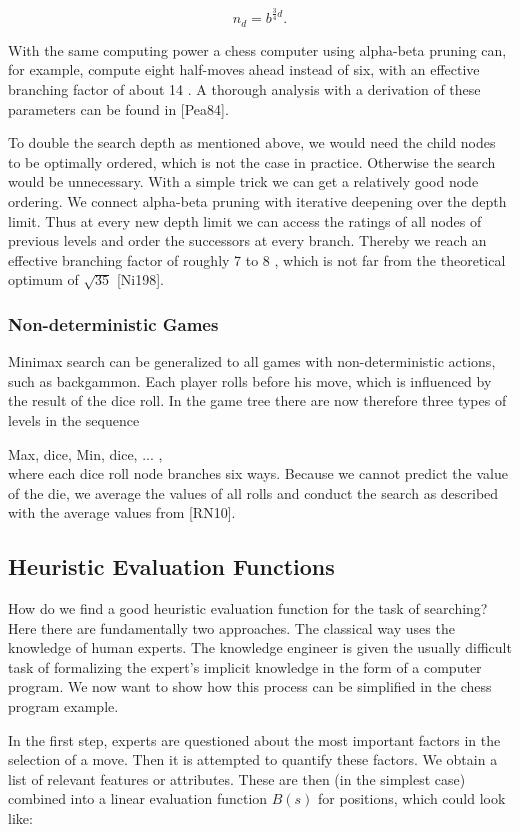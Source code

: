 \documentclass[10pt]{article}
\begin{document}
$$
n_{d}=b^{\frac{3}{4} d} .
$$

With the same computing power a chess computer using alpha-beta pruning can, for example, compute eight half-moves ahead instead of six, with an effective branching factor of about 14 . A thorough analysis with a derivation of these parameters can be found in [Pea84].

To double the search depth as mentioned above, we would need the child nodes to be optimally ordered, which is not the case in practice. Otherwise the search would be unnecessary. With a simple trick we can get a relatively good node ordering. We connect alpha-beta pruning with iterative deepening over the depth limit. Thus at every new depth limit we can access the ratings of all nodes of previous levels and order the successors at every branch. Thereby we reach an effective branching factor of roughly 7 to 8 , which is not far from the theoretical optimum of $\sqrt{35}$ [Ni198].

\subsubsection*{Non-deterministic Games}
Minimax search can be generalized to all games with non-deterministic actions, such as backgammon. Each player rolls before his move, which is influenced by the result of the dice roll. In the game tree there are now therefore three types of levels in the sequence

Max, dice, Min, dice, ... ,\\[0pt]
where each dice roll node branches six ways. Because we cannot predict the value of the die, we average the values of all rolls and conduct the search as described with the average values from [RN10].

\subsection*{Heuristic Evaluation Functions}
How do we find a good heuristic evaluation function for the task of searching? Here there are fundamentally two approaches. The classical way uses the knowledge of human experts. The knowledge engineer is given the usually difficult task of formalizing the expert's implicit knowledge in the form of a computer program. We now want to show how this process can be simplified in the chess program example.

In the first step, experts are questioned about the most important factors in the selection of a move. Then it is attempted to quantify these factors. We obtain a list of relevant features or attributes. These are then (in the simplest case) combined into a linear evaluation function $B(s)$ for positions, which could look like:
\end{document}
